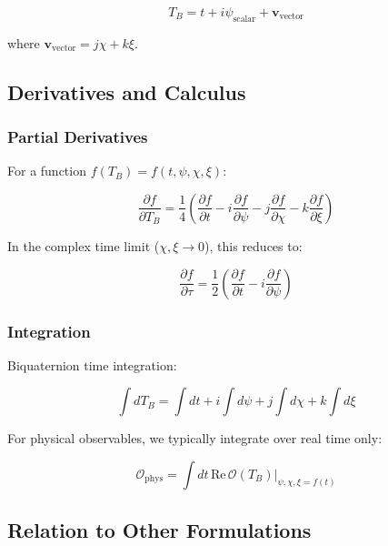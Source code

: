 \begin{equation}
\label{eq:canonical:tb_decomposition}
T_B = t + i\psi_{\text{scalar}} + \mathbf{v}_{\text{vector}}
\end{equation}

where $\mathbf{v}_{\text{vector}} = j\chi + k\xi$.

\subsection{Derivatives and Calculus}

\subsubsection{Partial Derivatives}

For a function $f(T_B) = f(t,\psi,\chi,\xi)$:

\begin{equation}
\label{eq:canonical:tb_derivatives}
\frac{\partial f}{\partial T_B} = \frac{1}{4}\left(\frac{\partial f}{\partial t} - i\frac{\partial f}{\partial \psi} - j\frac{\partial f}{\partial \chi} - k\frac{\partial f}{\partial \xi}\right)
\end{equation}

In the complex time limit ($\chi, \xi \to 0$), this reduces to:

\begin{equation}
\frac{\partial f}{\partial \tau} = \frac{1}{2}\left(\frac{\partial f}{\partial t} - i\frac{\partial f}{\partial \psi}\right)
\end{equation}

\subsubsection{Integration}

Biquaternion time integration:

\begin{equation}
\label{eq:canonical:tb_integration}
\int dT_B = \int dt + i \int d\psi + j \int d\chi + k \int d\xi
\end{equation}

For physical observables, we typically integrate over real time only:

\begin{equation}
\mathcal{O}_{\text{phys}} = \int dt \, \text{Re}\,\mathcal{O}(T_B)|_{\psi,\chi,\xi=f(t)}
\end{equation}

\subsection{Relation to Other Formulations}

